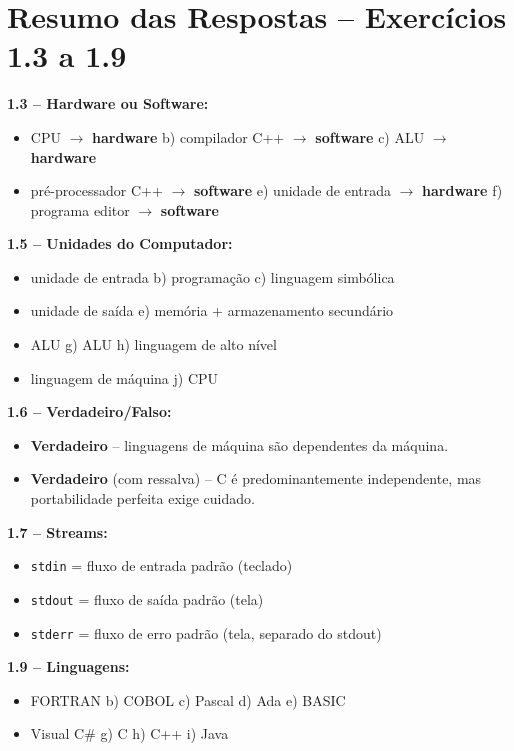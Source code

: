 \documentclass[12pt,a4paper]{article}
\begin{document}
\section*{Resumo das Respostas -- Exercícios 1.3 a 1.9}

\begin{tcolorbox}[colback=deitellightblue, colframe=deitelblue,
  title={\bfseries\large Gabarito Rápido}, breakable]

\textbf{1.3 -- Hardware ou Software:}
\begin{itemize}[noitemsep]
  \item[a)] CPU $\to$ \textbf{hardware} \quad
  b) compilador C++ $\to$ \textbf{software} \quad
  c) ALU $\to$ \textbf{hardware}
  \item[d)] pré-processador C++ $\to$ \textbf{software} \quad
  e) unidade de entrada $\to$ \textbf{hardware} \quad
  f) programa editor $\to$ \textbf{software}
\end{itemize}

\medskip
\textbf{1.5 -- Unidades do Computador:}
\begin{itemize}[noitemsep]
  \item[a)] unidade de entrada \quad b) programação \quad c) linguagem simbólica
  \item[d)] unidade de saída \quad e) memória + armazenamento secundário
  \item[f)] ALU \quad g) ALU \quad h) linguagem de alto nível
  \item[i)] linguagem de máquina \quad j) CPU
\end{itemize}

\medskip
\textbf{1.6 -- Verdadeiro/Falso:}
\begin{itemize}[noitemsep]
  \item[a)] \textbf{Verdadeiro} -- linguagens de máquina são dependentes da máquina.
  \item[b)] \textbf{Verdadeiro} (com ressalva) -- C é predominantemente independente,
  mas portabilidade perfeita exige cuidado.
\end{itemize}

\medskip
\textbf{1.7 -- Streams:}
\begin{itemize}[noitemsep]
  \item \texttt{stdin} = fluxo de entrada padrão (teclado)
  \item \texttt{stdout} = fluxo de saída padrão (tela)
  \item \texttt{stderr} = fluxo de erro padrão (tela, separado do stdout)
\end{itemize}

\medskip
\textbf{1.9 -- Linguagens:}
\begin{itemize}[noitemsep]
  \item[a)] FORTRAN \quad b) COBOL \quad c) Pascal \quad d) Ada \quad e) BASIC
  \item[f)] Visual C\# \quad g) C \quad h) C++ \quad i) Java
\end{itemize}

\end{tcolorbox}
\end{document}
